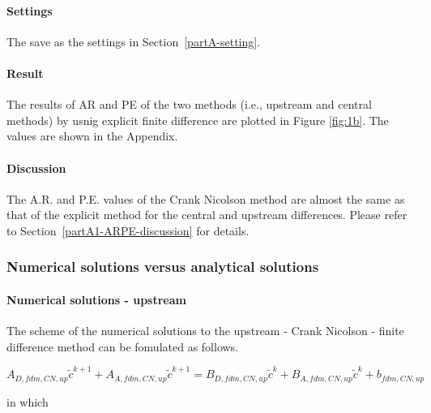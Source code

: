 \paragraph{Settings} The save as the settings in Section~\ref{partA-setting}.

\paragraph{Result} The results of AR and PE of the two methods (i.e., upstream and central methods) by usnig explicit finite difference are plotted in Figure \ref{fig:1b}. The values are shown in the Appendix.

\paragraph{Discussion}  The A.R. and P.E. values of the Crank Nicolson method are almost
the same as that of the explicit method for the central and upstream
differences. Please refer to Section~\ref{partA1-ARPE-discussion} for details.

\subsubsection{Numerical solutions versus analytical solutions}
\paragraph{Numerical solutions - upstream} The scheme of the numerical solutions to the upstream - Crank Nicolson - finite difference method can be fomulated as follows.

\begin{equation}
  \label{eq:14}
  A_{D,fdm,CN,up}{\tilde{c}}^{k+1}+A_{A,fdm,CN,up}{\tilde{c}}^{k+1}=B_{D,fdm,CN,up}{\tilde{c}}^{k}+B_{A,fdm,CN,up}{\tilde{c}}^{k}+b_{fdm,CN,up}
\end{equation}

in which

